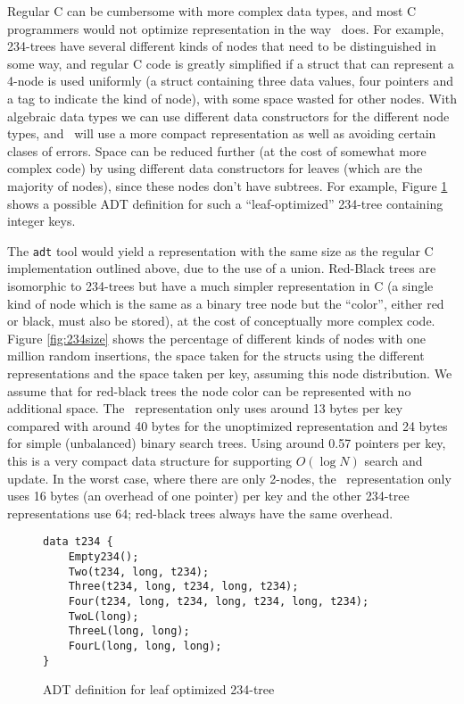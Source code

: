 Regular C can be cumbersome with more complex data types, and most
C programmers would not optimize representation in the way \adtpp\ does.
For example, 234-trees \cite{234tree} have several different kinds of
nodes that need to be distinguished in some way, and regular C code
is greatly simplified if a struct that can represent a 4-node is used
uniformly (a struct containing three data values, four pointers and a
tag to indicate the kind of node), with some space wasted for other nodes.
With algebraic data types we can use different data constructors for the
different node types, and \adtpp\ will use a more compact representation
as well as avoiding certain clases of errors.
Space can be reduced further (at the cost of somewhat more complex
code) by using different data constructors for leaves (which are the
majority of nodes), since these nodes don't have subtrees.  For example,
Figure \ref{fig:234adt} shows a possible ADT definition for such a
``leaf-optimized'' 234-tree containing integer keys.

The \texttt{adt}
tool would yield a representation with the same size as the regular
C implementation outlined above, due to the use of a union.  Red-Black
trees \cite{rbtree} are isomorphic to 234-trees but have a much simpler
representation in C (a single kind of node which is the same as a binary
tree node but the ``color'', either red or black, must also be stored),
at the cost of conceptually more complex code.
Figure \ref{fig:234size} shows the percentage of different kinds of nodes with
one million random insertions, the space taken for the structs using
the different representations and the space taken per key, assuming this
node distribution.  We assume that for red-black trees the node
color can be represented with no additional space.
The \adtpp\ representation only uses around 13 bytes
per key compared with around 40 bytes for the unoptimized representation
and 24 bytes for simple (unbalanced) binary search trees.  Using around
0.57 pointers per key, this is a very compact data structure for
supporting $O(\log{N})$ search and update. In the worst case, where there
are only 2-nodes, the \adtpp\ representation only uses 16 bytes (an overhead
of one pointer) per key and the other 234-tree representations use 64;
red-black trees always have the same overhead.  

\begin{figure}[!ht]
\begin{verbatim}
data t234 {
    Empty234();
    Two(t234, long, t234);
    Three(t234, long, t234, long, t234);
    Four(t234, long, t234, long, t234, long, t234);
    TwoL(long);
    ThreeL(long, long);
    FourL(long, long, long);
}
\end{verbatim}
\caption{ADT definition for leaf optimized 234-tree}
\label{fig:234adt}
\end{figure}


